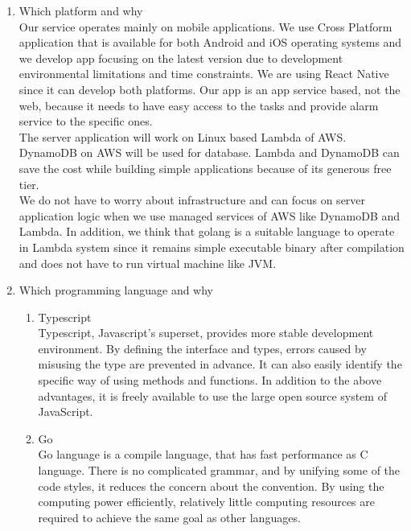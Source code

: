 \documentclass[conference]{IEEEtran}
\begin{document}
\begin{enumerate}
    \item Which platform and why \\
    Our service operates mainly on mobile applications. We use Cross Platform application that is available for both Android and iOS operating systems and we develop app focusing on the latest version due to development environmental limitations and time constraints. We are using React Native since it can develop both platforms. Our app is an app service based, not the web, because it needs to have easy access to the tasks and provide alarm service to the specific ones. \\
    
    The server application will work on Linux based Lambda of AWS. DynamoDB on AWS will be used for database. Lambda and DynamoDB can save the cost while building simple applications because of its generous free tier. \\
    
    We do not have to worry about infrastructure and can focus on server application logic when we use managed services of AWS like DynamoDB and Lambda. In addition, we think that golang is a suitable language to operate in Lambda system since it remains simple executable binary after compilation and does not have to run virtual machine like JVM.\\
    
    \item Which programming language and why
    \begin{enumerate}
        \item Typescript \\
        Typescript, Javascript's superset, provides more stable development environment. By defining the interface and types, errors caused by misusing the type are prevented in advance. It can also easily identify the specific way of using methods and functions. In addition to the above advantages, it is freely available to use the large open source system of JavaScript.\\
        \item Go \\
        Go language is a compile language, that has fast performance as C language. There is no complicated grammar, and by unifying some of the code styles, it reduces the concern about the convention. By using the computing power efficiently, relatively little computing resources are required to achieve the same goal as other languages.\\
        

\end{enumerate}
\end{enumerate}
\end{document}
